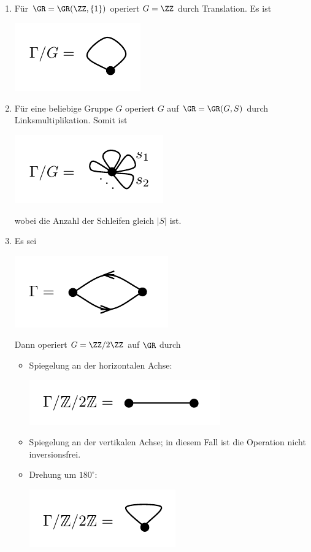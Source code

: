 \BSP\
\begin{enumerate}
\item Für $\GR=\GR(\ZZ,\{1\})$ operiert $G=\ZZ$ durch
Translation. Es ist
\begin{center}
	\includegraphics{grugraImages/quot1}
\end{center}
\item Für eine beliebige Gruppe $G$ operiert $G$ auf
$\GR=\GR(G,S)$ durch Linksmultiplikation.
Somit ist
\begin{center}
	\includegraphics{grugraImages/quot2}
\end{center}
wobei die Anzahl der Schleifen gleich $|S|$ ist.
\item Es sei
\begin{center}
	\includegraphics{grugraImages/quot3}
\end{center}
Dann operiert $G=\ZZ/2\ZZ$ auf $\GR$ durch
\begin{itemize}
\item Spiegelung an der horizontalen Achse:
\begin{center}
	\includegraphics{grugraImages/quot3a}
\end{center}
\item Spiegelung an der vertikalen Achse; in diesem Fall ist
die Operation nicht inversionsfrei.
\item
Drehung um $180^\circ$:
\begin{center}
	\includegraphics{grugraImages/quot3b}
\end{center}
\end{itemize}
\end{enumerate}

